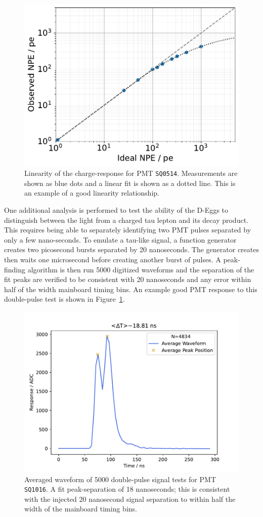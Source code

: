 \documentclass[main.tex]{subfiles}
\begin{document}
\begin{figure}
    \centering
    \includegraphics[width=0.7\linewidth]{figures/SQ0514_NPE_ideal_vs_observed.pdf}
    \caption{Linearity of the charge-response for PMT \texttt{SQ0514}. Measurements are shown as blue dots and a linear fit is shown as a dotted line. This is an example of a good linearity relationship.}
\end{figure}

One additional analysis is performed to test the ability of the D-Eggs to distinguish between the light from a charged tau lepton and its decay product. 
This requires being able to separately identifying two PMT pulses separated by only a few nano-seconds. 
To emulate a tau-like signal, a function generator creates two picosecond bursts separated by 20 nanoseconds. 
The generator creates then waits one microsecond before creating another burst of pulses. 
A peak-finding algorithm is then run 5000 digitized waveforms and the separation of the fit peaks are verified to be consistent with 20 nanoseconds and any error within half of the width mainboard timing bins.
An example good PMT response to this double-pulse test is shown in Figure~\ref{fig:double_pulse}.

\begin{figure}
    \centering
    \includegraphics[width=0.8\linewidth]{figures/ave_wf_bl_sub_every_wf_DEgg2021-3-082_SQ1016.pdf}
    \caption{Averaged waveform of 5000 double-pulse signal tests for PMT \texttt{SQ1016}. A fit peak-separation of 18 nanoseconds; this is consistent with the injected 20 nanosecond signal separation to within half the width of the mainboard timing bins.}\label{fig:double_pulse}
\end{figure}
\end{document}
